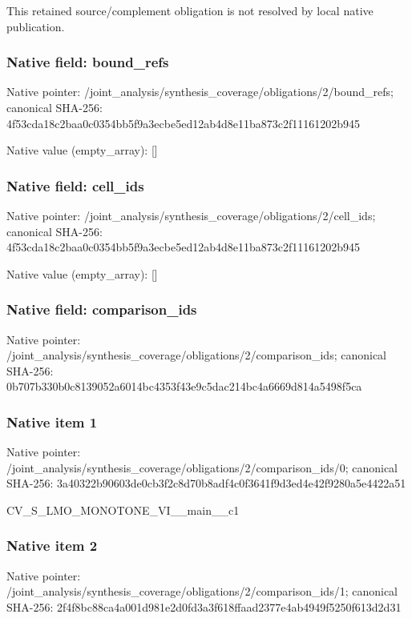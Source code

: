 \documentclass[10pt,a4paper]{article}
\begin{document}
\begingroup\raggedright\sloppy This retained source/\allowbreak{}complement obligation is not resolved by local native publication.\par\endgroup

\subsubsection{Native field: bound\_\allowbreak{}refs}
Native pointer: /joint\_\allowbreak{}analysis/synthesis\_\allowbreak{}coverage/obligations/2/bound\_\allowbreak{}refs; canonical SHA-256: 4f53cda18c2baa0c0354bb5f9a3ecbe5ed12ab4d8e11ba873c2f11161202b945

Native value (empty\_\allowbreak{}array): []

\subsubsection{Native field: cell\_\allowbreak{}ids}
Native pointer: /joint\_\allowbreak{}analysis/synthesis\_\allowbreak{}coverage/obligations/2/cell\_\allowbreak{}ids; canonical SHA-256: 4f53cda18c2baa0c0354bb5f9a3ecbe5ed12ab4d8e11ba873c2f11161202b945

Native value (empty\_\allowbreak{}array): []

\subsubsection{Native field: comparison\_\allowbreak{}ids}
Native pointer: /joint\_\allowbreak{}analysis/synthesis\_\allowbreak{}coverage/obligations/2/comparison\_\allowbreak{}ids; canonical SHA-256: 0b707b330b0c8139052a6014bc4353f43e9c5dac214bc4a6669d814a5498f5ca

\subsubsection{Native item 1}
Native pointer: /joint\_\allowbreak{}analysis/synthesis\_\allowbreak{}coverage/obligations/2/comparison\_\allowbreak{}ids/0; canonical SHA-256: 3a40322b90603de0cb3f2c8d70b8adf4c0f3641f9d3ed4e42f9280a5e4422a51

\begingroup\raggedright\sloppy CV\_\allowbreak{}S\_\allowbreak{}LMO\_\allowbreak{}MONOTONE\_\allowbreak{}VI\_\allowbreak{}\_\allowbreak{}main\_\allowbreak{}\_\allowbreak{}c1\par\endgroup

\subsubsection{Native item 2}
Native pointer: /joint\_\allowbreak{}analysis/synthesis\_\allowbreak{}coverage/obligations/2/comparison\_\allowbreak{}ids/1; canonical SHA-256: 2f4f8bc88ca4a001d981e2d0fd3a3f618ffaad2377e4ab4949f5250f613d2d31
\end{document}
